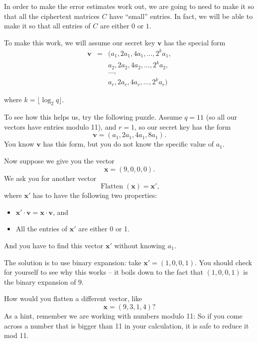 In order to make the error estimates work out, we are going to need to
make it so that all the ciphertext matrices \(C\) have ``small''
entries. In fact, we will be able to make it so that all entries of
\(C\) are either \(0\) or \(1\).

To make this work, we will assume our secret key \(\mathbf{v}\) has the
special form 
\begin{eqnarray}
\mathbf{v} & = & (a_{1},2a_{1},4a_{1},\ldots,2^{k}a_{1}, \nonumber \\
& & a_{2},2a_{2},4a_{2},\ldots,2^{k}a_{2}, \nonumber \\
& & \ldots , \nonumber \\
& & a_{r},2a_{r},4a_{r},\ldots,2^{k}a_{r})
\label{fhe-v-form}
\end{eqnarray}

where \(k = \lfloor\log_{2}q\rfloor\).

To see how this helps us, try the following puzzle. Assume \(q = 11\)
(so all our vectors have entries modulo 11), and \(r = 1\), so our
secret key has the form
\[\mathbf{v} = ( a_{1},2a_{1},4a_{1},8a_{1} ).\] You know
\(\mathbf{v}\) has this form, but you do not know the specific value of
\(a_{1}\).

Now suppose we give you the vector \[\mathbf{x} = (9,0,0,0).\] We ask
you for another vector
\[\operatorname{Flatten}( \mathbf{x} ) = \mathbf{x}',\] where
\(\mathbf{x}'\) has to have the following two properties:

\begin{itemize}
\item
  \(\mathbf{x}' \cdot \mathbf{v} = \mathbf{x} \cdot \mathbf{v}\), and
\item
  All the entries of \(\mathbf{x}'\) are either 0 or 1.
\end{itemize}

And you have to find this vector \(\mathbf{x}'\) without knowing
\(a_{1}\).

The solution is to use binary expansion: take
\(\mathbf{x}' = (1,0,0,1)\). You should check for yourself to see why
this works -- it boils down to the fact that \((1,0,0,1)\) is the binary
expansion of \(9\).

\begin{problem}
How would you flatten a different vector, like
\[\mathbf{x} = (9,3,1,4)?\] As a hint, remember we are working with
numbers modulo 11: So if you come across a number that is bigger than 11
in your calculation, it is safe to reduce it mod 11.
\end{problem}

